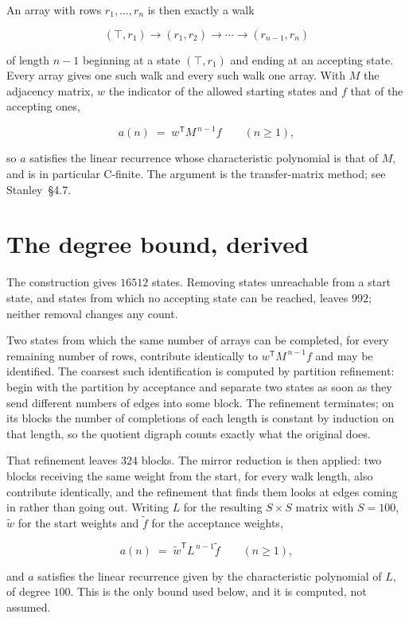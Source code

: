 \documentclass[11pt]{article}
\theoremstyle{definition}
\begin{document}
An array with rows $r_1,\dots,r_n$ is then exactly a walk

\[(\top,r_1) \to (r_1,r_2) \to \cdots \to (r_{n-1},r_n)\]

of length $n-1$ beginning at a state $(\top,r_1)$ and ending at an accepting state. Every array gives one such walk and every such walk one array. With $M$ the adjacency matrix, $w$ the indicator of the allowed starting states and $f$ that of the accepting ones,

\[a(n) \;=\; w^{\mathsf T} M^{\,n-1} f \qquad (n \ge 1),\]

so $a$ satisfies the linear recurrence whose characteristic polynomial is that of $M$, and is in particular C-finite. The argument is the transfer-matrix method; see Stanley~\S4.7.

\section{The degree bound, derived}

The construction gives $16512$ states. Removing states unreachable from a start state, and states from which no accepting state can be reached, leaves $992$; neither removal changes any count.

Two states from which the same number of arrays can be completed, for every remaining number of rows, contribute identically to $w^{\mathsf T}M^{\,n-1}f$ and may be identified. The coarsest such identification is computed by partition refinement: begin with the partition by acceptance and separate two states as soon as they send different numbers of edges into some block. The refinement terminates; on its blocks the number of completions of each length is constant by induction on that length, so the quotient digraph counts exactly what the original does.

That refinement leaves $324$ blocks. The mirror reduction is then applied: two blocks receiving the same weight from the start, for every walk length, also contribute identically, and the refinement that finds them looks at edges coming in rather than going out. Writing $L$ for the resulting $S \times S$ matrix with $S = 100$, $\tilde w$ for the start weights and $\tilde f$ for the acceptance weights,

\[a(n) \;=\; \tilde w^{\mathsf T} L^{\,n-1} \tilde f \qquad (n \ge 1),\]

and $a$ satisfies the linear recurrence given by the characteristic polynomial of $L$, of degree $100$. This is the only bound used below, and it is computed, not assumed.
\end{document}

